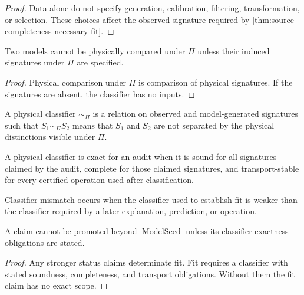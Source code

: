 \begin{proof}
Data alone do not specify generation, calibration, filtering, transformation, or selection. These choices affect the observed signature required by \autoref{thm:source-completeness-necessary-fit}.
\end{proof}

\begin{theorem}
\label{thm:signature-completeness-necessary-comparison}
Two models cannot be physically compared under $\Pi$ unless their induced signatures under $\Pi$ are specified.
\end{theorem}

\begin{proof}
Physical comparison under $\Pi$ is comparison of physical signatures. If the signatures are absent, the classifier has no inputs.
\end{proof}

\begin{definition}
\label{def:physical-classifier-audit}
A physical classifier $\sim_{\Pi}$ is a relation on observed and model-generated signatures such that $S_1\sim_{\Pi}S_2$ means that $S_1$ and $S_2$ are not separated by the physical distinctions visible under $\Pi$.
\end{definition}

\begin{definition}
\label{def:classifier-exactness}
A physical classifier is exact for an audit when it is sound for all signatures claimed by the audit, complete for those claimed signatures, and transport-stable for every certified operation used after classification.
\end{definition}

\begin{definition}
\label{def:classifier-mismatch-audit}
Classifier mismatch occurs when the classifier used to establish fit is weaker than the classifier required by a later explanation, prediction, or operation.
\end{definition}

\begin{theorem}
\label{thm:classifier-obligations-promoted-fit}
A claim cannot be promoted beyond $\operatorname{ModelSeed}$ unless its classifier exactness obligations are stated.
\end{theorem}

\begin{proof}
Any stronger status claims determinate fit. Fit requires a classifier with stated soundness, completeness, and transport obligations. Without them the fit claim has no exact scope.
\end{proof}

